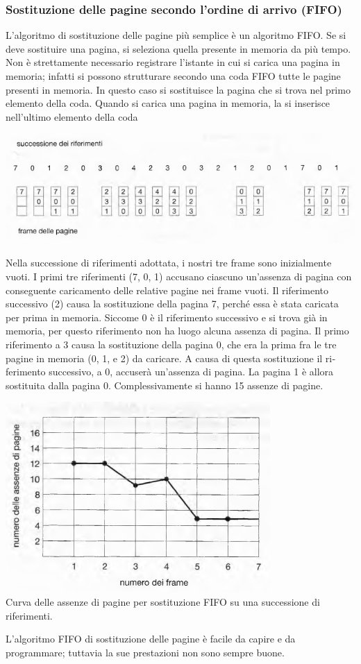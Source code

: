 \documentclass[11pt,a4paper]{article}
\begin{document}
\subsubsection{Sostituzione delle pagine secondo l'ordine di arrivo (FIFO)}
L'algoritmo di sostituzione delle pagine più semplice è un algoritmo FIFO. Se si
deve sostituire una pagina, si seleziona quella presente in memoria da più tempo. Non è strettamente necessario registrare l'istante in cui si carica una pagina in memoria; infatti si possono strutturare secondo una coda FIFO tutte le pagine presenti in me­moria. In questo caso si sostituisce la pagina che si trova nel primo elemento della coda.
Quando si carica una pagina in memoria, la si inserisce nell'ultimo elemento della coda\medskip\\
\begin{center}
  \includegraphics[scale=0.6]{img/0047.png}
\end{center}
Nella successione di riferimenti adottata, i nostri tre frame sono inizialmente vuoti. I
primi tre riferimenti (7, 0, 1) accusano ciascuno un'assenza di pagina con conseguente cari­camento delle relative pagine nei frame vuoti. Il riferimento successivo (2) causa la sostitu­zione della pagina 7, perché essa è stata caricata per prima in memoria. Siccome 0 è il riferi­mento successivo e si trova già in memoria, per questo riferimento non ha luogo alcuna as­senza di pagina. Il primo riferimento a 3 causa la sostituzione della pagina 0, che era la
prima fra le tre pagine in memoria (0, 1, e 2) da caricare. A causa di questa sostituzione il ri­ferimento successivo, a 0, accuserà un'assenza di pagina. La pagina 1 è allora sostituita dalla
pagina 0. Complessivamen­te si hanno 15 assenze di pagine.
\begin{center}
  \includegraphics[scale=0.6]{img/0048.png}\\
  \caption{Curva delle assenze di pagine per sostituzione FIFO su una successione di riferimenti.}
\end{center}
L'algoritmo FIFO di sostituzione delle pagine è facile da capire e da programmare; tut­tavia la sue prestazioni non sono sempre buone.
\end{document}
